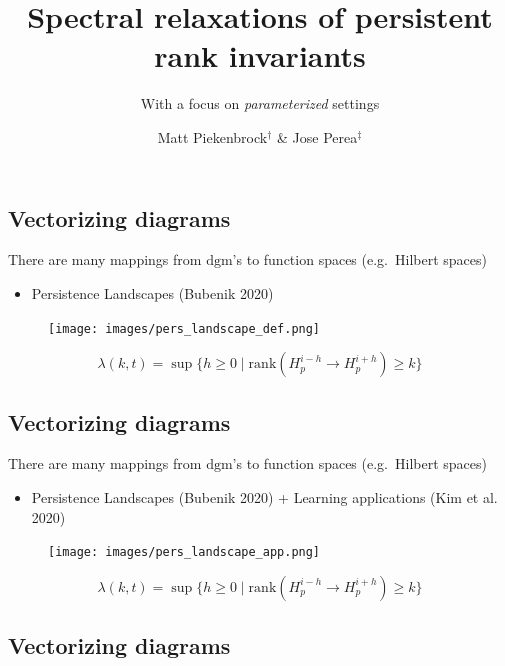 \documentclass[
  letterpaper,
  DIV=11,
  numbers=noendperiod,
  oneside]{scrartcl}
\title{Spectral relaxations of persistent rank invariants}
\subtitle{With a focus on \emph{parameterized} settings}
\author{Matt Piekenbrock\(\mathrm{}^\dagger\) \& Jose
Perea\(\mathrm{}^\ddagger\)}
\date{}
\providecommand{\tightlist}{%
  \setlength{\itemsep}{0pt}\setlength{\parskip}{0pt}}\usepackage{longtable,booktabs,array}
\begin{document}
\maketitle
\subsection{Vectorizing diagrams}\label{vectorizing-diagrams}

There are many mappings from \(\mathrm{dgm}\)'s to function spaces
(e.g.~Hilbert spaces)

\begin{itemize}
\tightlist
\item
  Persistence Landscapes (Bubenik 2020)
\end{itemize}

\begin{figure}

{\centering \texttt{[image: images/pers\_landscape\_def.png]}

}

\end{figure}

\[ \lambda(k, t) = \sup \{ h \geq 0 \mid \mathrm{rank}(H_p^{i-h} \to H_p^{i+h}) \geq k \} \]

\subsection{Vectorizing diagrams}\label{vectorizing-diagrams-1}

There are many mappings from \(\mathrm{dgm}\)'s to function spaces
(e.g.~Hilbert spaces)

\begin{itemize}
\tightlist
\item
  Persistence Landscapes (Bubenik 2020) + Learning applications (Kim et
  al. 2020)
\end{itemize}

\begin{figure}

{\centering \texttt{[image: images/pers\_landscape\_app.png]}

}

\end{figure}

\[ \lambda(k, t) = \sup \{ h \geq 0 \mid \mathrm{rank}(H_p^{i-h} \to H_p^{i+h}) \geq k \} \]

\subsection{Vectorizing diagrams}\label{vectorizing-diagrams-2}
\end{document}
